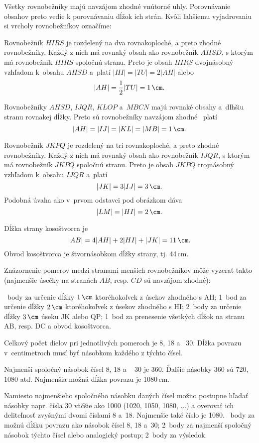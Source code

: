 {%
Všetky rovnobežníky majú navzájom zhodné vnútorné uhly.
Porovnávanie obsahov preto vedie k porovnávaniu dĺžok ich strán.
Kvôli ľahšiemu vyjadrovaniu si vrcholy rovnobežníkov označíme:
%

Rovnobežník $HIRS$ je rozdelený na dva rovnakoploché, a preto zhodné rovnobežníky.
Každý z nich má rovnaký obsah ako rovnobežník $AHSD$, s ktorým má rovnobežník $HIRS$ spoločnú stranu.
Preto je obsah $HIRS$ dvojnásobný vzhľadom k~obsahu $AHSD$ a~platí $|HI|=|TU|=2|AH|$ alebo
$$
|AH|=\frac12|TU|=1\,\cm.
$$

Rovnobežníky $AHSD$, $IJQR$, $KLOP$ a~$MBCN$ majú rovnaké obsahy a~dlhšiu stranu rovnakej dĺžky.
Preto sú rovnobežníky navzájom  zhodné ~platí
$$
|AH|=|IJ|=|KL|=|MB|=1\,\cm.
$$

Rovnobežník $JKPQ$ je rozdelený na tri rovnakoploché, a preto zhodné rovnobežníky.
Každý z nich má rovnaký obsah ako rovnobežník $IJQR$, s ktorým má rovnobežník $JKPQ$ spoločnú stranu.
Preto je obsah $JKPQ$ trojnásobný vzhľadom k~obsahu $IJQR$ a~platí
$$
|JK|=3|IJ|=3\,\cm.
$$
Podobná úvaha ako v~prvom odstavci pod obrázkom dáva
$$
|LM|=|HI|=2\,\cm.
$$

Dĺžka strany kosoštvorca je
$$
|AB| = 4|AH|+2|HI|+|JK| = 11\,\cm.
$$
Obvod kosoštvorca je štvornásobkom dĺžky strany, tj. 44\,cm.

\poznamka
Znázornenie pomerov medzi stranami menších rovnobežníkov môže vyzerať takto
(najmenšie úsečky na stranách $AB$, resp. $CD$ sú navzájom zhodné):
%

~body za určenie dĺžky $1\,\cm$ ktoréhokoľvek z úsekov zhodného s AH;
1~bod za určenie dĺžky  $2\,\cm$ ktoréhokoľvek z úsekov zhodného s HI;
2~body za určenie dĺžky $3\,\cm$ úseku JK alebo QP;
1~bod za prenesenie všetkých dĺžok na stranu AB, resp. DC a obvod kosoštvorca.
\endhodnotenie
}

{%
Celkový počet dielov pri jednotlivých pomeroch je 8, 18 a ~30.
Dĺžka povrazu v~centimetroch musí byť násobkom každého z týchto čísel.

Najmenší spoločný násobok čísel 8, 18 a ~ 30 je 360.
Ďalšie násobky 360 sú 720, 1080 atď.
Najmenšia možná dĺžka povrazu je 1080\,cm.

\poznamka
Namiesto najmenšieho spoločného násobku daných čísel možno postupne hľadať násobky napr. čísla 30 väčšie ako 1000 (1020, 1050, 1080, ...) a overovať ich deliteľnosť zvyšnými dvomi číslami 8 a~18.
Najmenšie také číslo je 1080. 
~body za možnú dĺžku povrazu ako násobok čísel 8, 18 a~30;
2~body za najmenší spoločný násobok týchto čísel alebo analogický postup;
2~body za výsledok.
\endhodnotenie
}


